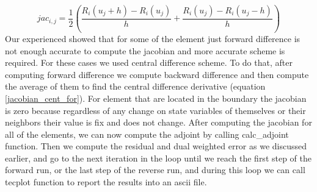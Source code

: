 \documentclass[a4paper,10pt]{article}
\begin{document}
\begin{equation}\label{jacobian_cent_for}
jac_{i,j}=\frac{1}{2}(
\frac{R_i(u_j+h)-R_i(u_j)}{h}+
\frac{R_i(u_j)-R_i(u_j-h)}{h})
\end{equation}
%
Our experienced showed that for some of the element just forward difference is not enough accurate to compute the jacobian and more accurate scheme is required. For these cases we used central difference scheme. To do that, after computing forward difference we compute backward difference and then compute the average of them to find the central difference derivative (equation \ref{jacobian_cent_for}).\newline
For element that are located in the boundary the jacobian is zero because regardless of any change on state variables of themselves or their neighbors their value is fix and does not change.\newline
After computing the jacobian for all of the elements, we can now compute the adjoint by calling calc\_adjoint function. Then we compute the residual and dual weighted error as we discussed earlier, and go to the next iteration in the loop until we reach the first step of the forward run, or the last step of the reverse run, and during this loop we can call tecplot function to report the results into an ascii file.
\end{document}
